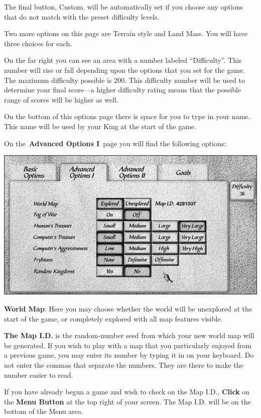The final button, Custom, will be automatically set if you choose any options that do not match with the preset difficulty levels.

Two more options on this page are Terrain style and Land Mass. You will have three choices for each.

On the far right you can see an area with a number labeled “Difficulty”. This number will rise or fall depending upon the options that you set for the game. The maximum difficulty possible is 200. This difficulty number will be used to determine your final score---a higher difficulty rating means that the possible range of scores will be higher as well.

On the bottom of this options page there is space for you to type in your name. This name will be used by your King at the start of the game.

On the \textbf{Advanced Options I} page you will find the following options:

\begin{center}
	\includegraphics[width=0.9\linewidth]{Iadvancedoptions1}
\end{center}

\textbf{World Map}: Here you may choose whether the world will be unexplored at the start of the game, or completely explored with all map features visible.

\begin{changemargin}{0.5cm}{0cm} 
 \textbf{The Map I.D.} is the random-number seed from which your new world map will be generated. If you wish to play with a map that you particularly enjoyed from a previous game, you may enter its number by typing it in on your keyboard. Do not enter the commas that separate the numbers. They are there to make the number easier to read.
\end{changemargin}

\begin{changemargin}{0.5cm}{0cm} 
 If you have already begun a game and wish to check on the Map I.D., \textbf{Click} on the \textbf{Menu Button} at the top right of your screen. The Map I.D. will be on the bottom of the Menu area.
\end{changemargin}

